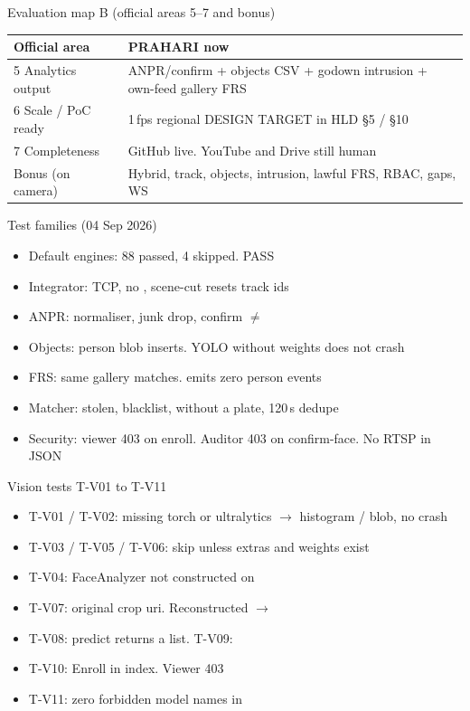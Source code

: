 \documentclass[aspectratio=169,11pt]{beamer}
\begin{document}
\begin{frame}{Evaluation map B (official areas 5--7 and bonus)}
\begin{center}
\begin{tabular}{@{}p{}p{}@{}}
\toprule
Official area & PRAHARI now \\
\midrule
5 Analytics output & ANPR/confirm + objects CSV + godown intrusion + own-feed gallery FRS \\
6 Scale / PoC ready & 1\,fps regional DESIGN TARGET in HLD \S5 / \S10 \\
7 Completeness & GitHub live. YouTube and Drive still human \\
Bonus (on camera) & Hybrid, track, objects, intrusion, lawful FRS, RBAC, gaps, WS \\
\bottomrule
\end{tabular}
\end{center}
\end{frame}

\begin{frame}{Test families (04 Sep 2026)}
\begin{itemize}\itemsep0.45em
\item Default engines: 88 passed, 4 skipped.  PASS
\item Integrator: TCP, no , scene-cut resets track ids
\item ANPR: normaliser, junk drop, confirm $\neq$ 
\item Objects: person blob inserts. YOLO without weights does not crash
\item FRS: same gallery matches.  emits zero person events
\item Matcher: stolen, blacklist,  without a plate, 120\,s dedupe
\item Security: viewer 403 on enroll. Auditor 403 on confirm-face. No RTSP in JSON
\end{itemize}
\end{frame}

\begin{frame}{Vision tests T-V01 to T-V11}
\begin{itemize}\itemsep0.4em
\item T-V01 / T-V02: missing torch or ultralytics $\to$ histogram / blob, no crash
\item T-V03 / T-V05 / T-V06: skip unless extras and weights exist
\item T-V04: FaceAnalyzer not constructed on 
\item T-V07: original crop uri. Reconstructed $\to$ 
\item T-V08: predict returns a list. T-V09: 
\item T-V10: Enroll in index. Viewer 403
\item T-V11: zero forbidden model names in 
\end{itemize}
\end{frame}
\end{document}
